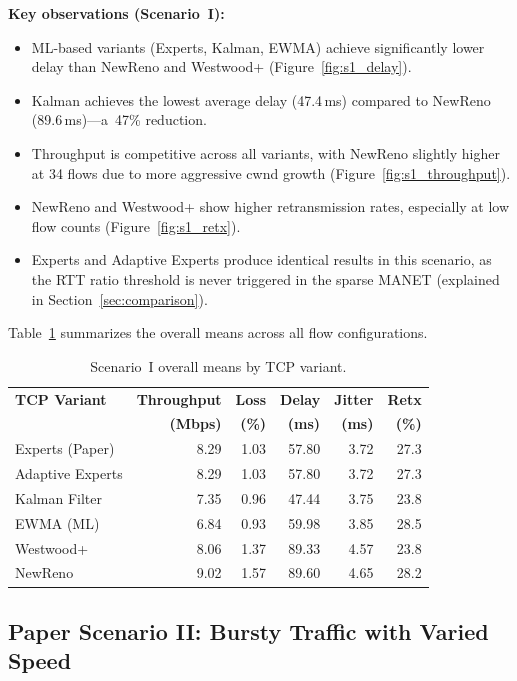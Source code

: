 \documentclass[12pt,a4paper]{article}
\begin{document}
\textbf{Key observations (Scenario~I):}
\begin{itemize}[nosep]
    \item ML-based variants (Experts, Kalman, EWMA) achieve significantly lower delay than NewReno and Westwood+
    (Figure~\ref{fig:s1_delay}).
    \item Kalman achieves the lowest average delay (47.4\,ms) compared to NewReno (89.6\,ms)---a~47\% reduction.
    \item Throughput is competitive across all variants, with NewReno slightly higher at 34 flows due to more aggressive cwnd growth (Figure~\ref{fig:s1_throughput}).
    \item NewReno and Westwood+ show higher retransmission rates, especially at low flow counts (Figure~\ref{fig:s1_retx}).
    \item Experts and Adaptive Experts produce identical results in this scenario, as the RTT ratio threshold is never triggered in the sparse MANET (explained in Section~\ref{sec:comparison}).
\end{itemize}

Table~\ref{tab:s1_summary} summarizes the overall means across all flow configurations.

\begin{table}[H]
\centering
\caption{Scenario~I overall means by TCP variant.}
\label{tab:s1_summary}
\small
\begin{tabular}{l r r r r r}
\toprule
\textbf{TCP Variant} & \textbf{Throughput} & \textbf{Loss} & \textbf{Delay} & \textbf{Jitter} & \textbf{Retx} \\
 & \textbf{(Mbps)} & \textbf{(\%)} & \textbf{(ms)} & \textbf{(ms)} & \textbf{(\%)} \\
\midrule
Experts (Paper) & 8.29 & 1.03 & 57.80 & 3.72 & 27.3 \\
Adaptive Experts & 8.29 & 1.03 & 57.80 & 3.72 & 27.3 \\
Kalman Filter & 7.35 & 0.96 & 47.44 & 3.75 & 23.8 \\
EWMA (ML) & 6.84 & 0.93 & 59.98 & 3.85 & 28.5 \\
Westwood+ & 8.06 & 1.37 & 89.33 & 4.57 & 23.8 \\
NewReno & 9.02 & 1.57 & 89.60 & 4.65 & 28.2 \\
\bottomrule
\end{tabular}
\end{table}

\subsection{Paper Scenario II: Bursty Traffic with Varied Speed}
\label{sec:results_s2}
\end{document}
